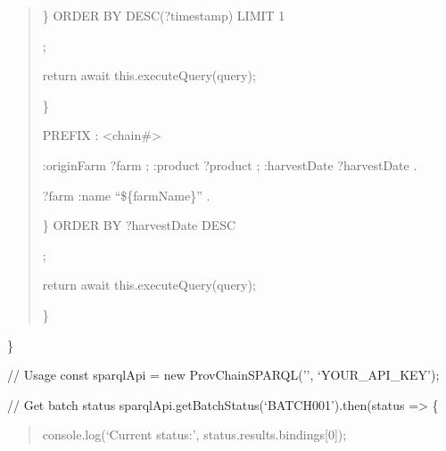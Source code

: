 \documentclass[letterpaper,10pt,english]{sphinxmanual}
\begin{document}
\begin{quote}
\begin{description}
\begin{description}
\begin{description}
\begin{description}
\end{description}

\end{description}

\sphinxAtStartPar
\}
ORDER BY DESC(?timestamp)
LIMIT 1

\end{description}

\sphinxAtStartPar
{\color{red}\bfseries{}\textasciigrave{}};

\sphinxAtStartPar
return await this.executeQuery(query);

\end{description}

\sphinxAtStartPar
\}
\begin{description}
\begin{description}
\sphinxAtStartPar
PREFIX : \textless{}\sphinxhyphen{}chain\#\textgreater{}
\begin{description}
\begin{description}
\sphinxAtStartPar
:originFarm ?farm ;
:product ?product ;
:harvestDate ?harvestDate .

\end{description}

\sphinxAtStartPar
?farm :name “\$\{farmName\}” .

\end{description}

\sphinxAtStartPar
\}
ORDER BY ?harvestDate DESC

\end{description}

\sphinxAtStartPar
{\color{red}\bfseries{}\textasciigrave{}};

\sphinxAtStartPar
return await this.executeQuery(query);

\end{description}

\sphinxAtStartPar
\}
\end{quote}

\sphinxAtStartPar
\}

\sphinxAtStartPar
// Usage
const sparqlApi = new ProvChainSPARQL(’’, ‘YOUR\_API\_KEY’);

\sphinxAtStartPar
// Get batch status
sparqlApi.getBatchStatus(‘BATCH\sphinxhyphen{}001’).then(status =\textgreater{} \{
\begin{quote}

\sphinxAtStartPar
console.log(‘Current status:’, status.results.bindings{[}0{]});
\end{quote}
\end{document}
